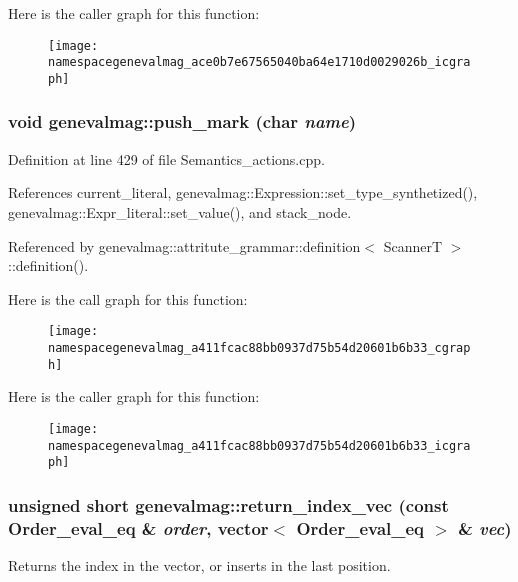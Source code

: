 Here is the caller graph for this function:\nopagebreak
\begin{figure}[H]
\begin{center}
\leavevmode
\texttt{[image: namespacegenevalmag\_ace0b7e67565040ba64e1710d0029026b\_icgraph]}
\end{center}
\end{figure}


\hypertarget{namespacegenevalmag_a411fcac88bb0937d75b54d20601b6b33}{
\subsubsection[{push\_\-mark}]{\setlength{\rightskip}{0pt plus 5cm}void genevalmag::push\_\-mark (char {\em name})}}
\label{namespacegenevalmag_a411fcac88bb0937d75b54d20601b6b33}


Definition at line 429 of file Semantics\_\-actions.cpp.



References current\_\-literal, genevalmag::Expression::set\_\-type\_\-synthetized(), genevalmag::Expr\_\-literal::set\_\-value(), and stack\_\-node.



Referenced by genevalmag::attritute\_\-grammar::definition$<$ ScannerT $>$::definition().



Here is the call graph for this function:\nopagebreak
\begin{figure}[H]
\begin{center}
\leavevmode
\texttt{[image: namespacegenevalmag\_a411fcac88bb0937d75b54d20601b6b33\_cgraph]}
\end{center}
\end{figure}




Here is the caller graph for this function:\nopagebreak
\begin{figure}[H]
\begin{center}
\leavevmode
\texttt{[image: namespacegenevalmag\_a411fcac88bb0937d75b54d20601b6b33\_icgraph]}
\end{center}
\end{figure}


\hypertarget{namespacegenevalmag_a4c59332bf08ed52e98321fe6b6340f29}{
\subsubsection[{return\_\-index\_\-vec}]{\setlength{\rightskip}{0pt plus 5cm}unsigned short genevalmag::return\_\-index\_\-vec (const Order\_\-eval\_\-eq \& {\em order}, \/  vector$<$ Order\_\-eval\_\-eq $>$ \& {\em vec})}}
\label{namespacegenevalmag_a4c59332bf08ed52e98321fe6b6340f29}
Returns the index in the vector, or inserts in the last position. 


